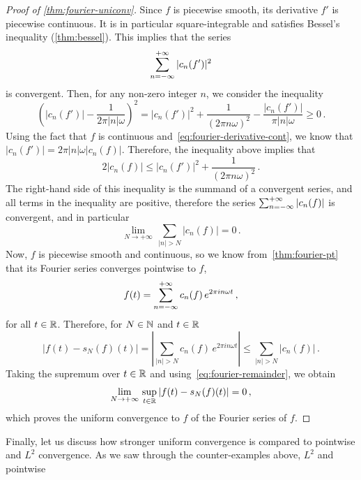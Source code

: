 \begin{proof}[Proof of \cref{thm:fourier-uniconv}]
	Since $f$ is piecewise smooth, its derivative $f'$ is piecewise continuous. It is in
	particular square-integrable and satisfies Bessel's inequality (\cref{thm:bessel}). This
	implies that the series
	\begin{equation}
		\sum_{n=-\infty}^{+\infty}|c_n(f')|^2
	\end{equation}
	is convergent. Then, for any non-zero integer $n$, we consider the inequality
	\begin{equation}
		\left(|c_n(f')|-\frac{1}{2\pi |n|\omega}\right)^2=|c_n(f')|^2
		+\frac{1}{(2\pi n\omega)^2}-\frac{|c_n(f')|}{\pi |n|\omega}\geq 0\,.
	\end{equation}
	Using the fact that $f$ is continuous and~\cref{eq:fourier-derivative-cont}, we know
	that $|c_n(f')|=2\pi|n|\omega |c_n(f)|$. Therefore, the inequality above implies that
	\begin{equation}
		2|c_n(f)|\leq |c_n(f')|^2
		+\frac{1}{(2\pi n\omega)^2}\,.
		\label{eq:fourier-remainder}
	\end{equation}
	The right-hand side of this inequality is the summand of a convergent series, and all
	terms in the inequality are positive, therefore the series $\sum_{n=-\infty}^{+\infty}|c_n(f)|$ is
	convergent, and in particular
	\begin{equation}
		\lim_{N\to+\infty}\,\sum_{|n|>N}|c_n(f)|=0\,.
	\end{equation}
	Now, $f$ is piecewise smooth and continuous, so we know from~\cref{thm:fourier-pt} that
	its Fourier series converges pointwise to $f$, \ie
	\begin{equation}
		f(t)=\sum_{n=-\infty}^{+\infty}c_n(f)\,e^{2\pi i n\omega t}\,,
	\end{equation}
	for all $t\in\mathbb{R}$. Therefore, for $N\in\mathbb{N}$ and $t\in\mathbb{R}$
	\begin{equation}
		|f(t)-s_N(f)(t)|=\left|\sum_{|n|>N}c_n(f)\,e^{2\pi i n\omega t}\right|
		\leq \sum_{|n|>N}|c_n(f)|\,.
	\end{equation}
	Taking the supremum over $t\in\mathbb{R}$ and using~\cref{eq:fourier-remainder}, we obtain
	\begin{equation}
		\lim_{N\to+\infty}\,\sup_{t\in\mathbb{R}}|f(t)-s_N(f)(t)|=0\,,
	\end{equation}
	which proves the uniform convergence to $f$ of the Fourier series of $f$.
\end{proof}
Finally, let us discuss how stronger uniform convergence is compared to pointwise and
$L^2$ convergence. As we saw through the counter-examples above, $L^2$ and pointwise
